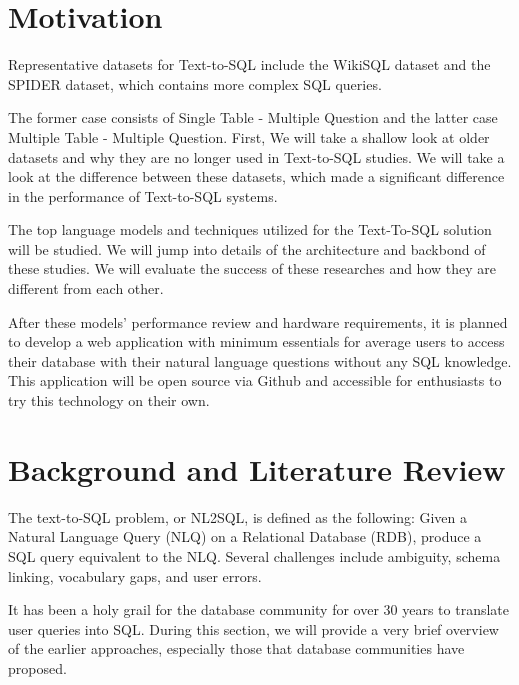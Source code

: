 \section{Motivation}

Representative datasets for Text-to-SQL include the WikiSQL\cite{zhong_seq2sql_2017} dataset and
the SPIDER\cite{yu_spider_2019} dataset, which contains more complex SQL queries.

The former case consists of Single Table - Multiple Question and the latter case Multiple Table - Multiple Question.
First, We will take a shallow look at older datasets and why they are no longer used in Text-to-SQL studies.
We will take a look at the difference between these datasets, which made a significant difference in the performance of Text-to-SQL systems.

The top language models and techniques utilized for the Text-To-SQL solution will be studied. We will jump into details of the architecture and backbond of these studies. We will evaluate the success of these researches and how they are different from each other.

After these models' performance review and hardware requirements, it is planned to develop a web application with minimum essentials for average users to access their database with their natural language questions without any SQL knowledge. This application will be open source via Github and accessible for enthusiasts to try this technology on their own.


\section{Background and Literature Review}

The text-to-SQL problem, or NL2SQL, is defined as the following: Given a Natural Language Query (NLQ) on a Relational Database (RDB), produce a SQL query equivalent to the NLQ. Several challenges include ambiguity, schema linking, vocabulary gaps, and user errors.

It has been a holy grail for the database community for over 30 years to translate user queries into SQL. During this section, we will provide a very brief overview of the earlier approaches, especially those that database communities have proposed.


